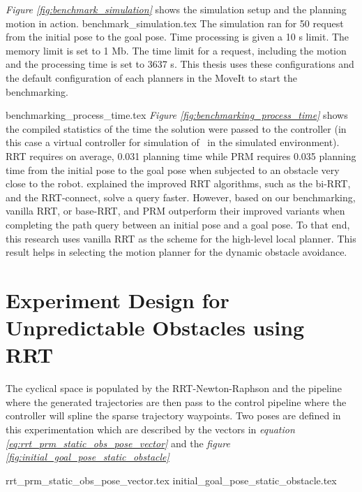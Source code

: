 {\textit{Figure \ref{fig:benchmark_simulation}} shows the simulation 
setup and the planning motion in action. 
{benchmark_simulation.tex}
The simulation ran for 50 request from the initial pose to 
the goal pose. Time processing is given a 10 s limit. The memory limit
is set to 1 Mb. The time limit for a request, including the motion and the
processing time is set to 3637 s. This thesis uses these configurations and
the default configuration of each planners in the MoveIt to start the benchmarking. 

{benchmarking_process_time.tex}
\textit{Figure \ref{fig:benchmarking_process_time}} shows the 
compiled statistics of the time the solution were passed to the 
controller (in this case a virtual controller for simulation of 
\rimini \ in the simulated environment). RRT requires on average,
0.031 planning time while PRM requires 0.035 planning time from
the initial pose to the goal pose when subjected to an obstacle
very close to the robot. 
\textcite{Wei2018} explained the improved RRT algorithms, such as 
the bi-RRT, and the RRT-connect, 
solve a query faster. However, based on our benchmarking, 
vanilla RRT, or base-RRT, and PRM outperform their improved variants when
completing the path query between an initial pose and a goal pose. 
To that end, this research uses vanilla RRT as the scheme for the 
high-level local planner. 
This result helps in selecting the
motion planner for the dynamic obstacle avoidance. 


\section{Experiment Design for Unpredictable Obstacles using RRT}

The cyclical space is populated by the RRT-Newton-Raphson and the
pipeline where the generated trajectories are
then pass to the control pipeline where
the controller will spline the sparse trajectory
waypoints. Two poses are defined in this experimentation which are described by 
the vectors in \textit{equation \ref{eq:rrt_prm_static_obs_pose_vector}}
and the \textit{figure \ref{fig:initial_goal_pose_static_obstacle}}


{rrt_prm_static_obs_pose_vector.tex}
{initial_goal_pose_static_obstacle.tex}

}
